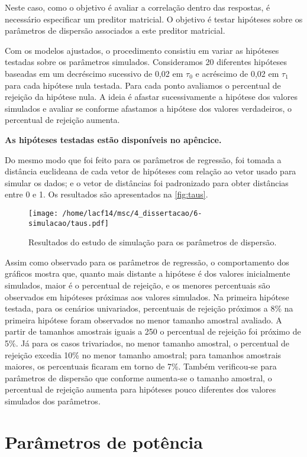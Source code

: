 Neste caso, como o objetivo é avaliar a correlação dentro das respostas, é necessário especificar um preditor matricial. O objetivo é testar hipóteses sobre os parâmetros de dispersão associados a este preditor matricial. 

Com os modelos ajustados, o procedimento consistiu em variar as hipóteses testadas sobre os parâmetros simulados. Consideramos 20 diferentes hipóteses baseadas em um decréscimo sucessivo de 0,02 em $\tau_0$ e acréscimo de 0,02 em $\tau_1$ para cada hipótese nula testada. Para cada ponto avaliamos o percentual de rejeição da hipótese nula. A ideia é afastar sucessivamente a hipótese dos valores simulados e avaliar se conforme afastamos a hipótese dos valores verdadeiros, o percentual de rejeição aumenta. 

\textbf{As hipóteses testadas estão disponíveis no apêncice.}

Do mesmo modo que foi feito para os parâmetros de regressão, foi tomada a distância euclideana de cada vetor de hipóteses com relação ao vetor usado para simular os dados; e o vetor de distâncias foi padronizado para obter distâncias entre 0 e 1. Os resultados são apresentados na \autoref{fig:taus}.

\begin{figure}[H]
\centering
\texttt{[image: /home/lacf14/msc/4\_dissertacao/6-simulacao/taus.pdf]}
\caption{Resultados do estudo de simulação para os parâmetros de dispersão.}
\label{fig:taus}
\end{figure}

Assim como observado para os parâmetros de regressão, o comportamento dos gráficos mostra que, quanto mais distante a hipótese é dos valores inicialmente simulados, maior é o percentual de rejeição, e os menores percentuais são observados em hipóteses próximas aos valores simulados. Na primeira hipótese testada, para os cenários univariados, percentuais de rejeição próximos a 8\% na primeira hipótese foram observados no menor tamanho amostral avaliado. A partir de tamanhos amostrais iguais a 250 o percentual de rejeição foi próximo de 5\%. Já para os casos trivariados, no menor tamanho amostral, o percentual de rejeição excedia 10\% no menor tamanho amostral; para tamanhos amostrais maiores, os percentuais ficaram em torno de 7\%. Também verificou-se para parâmetros de dispersão que conforme aumenta-se o tamanho amostral, o percentual de rejeição aumenta para hipóteses pouco diferentes dos valores simulados dos parâmetros.

\section{Parâmetros de potência}

